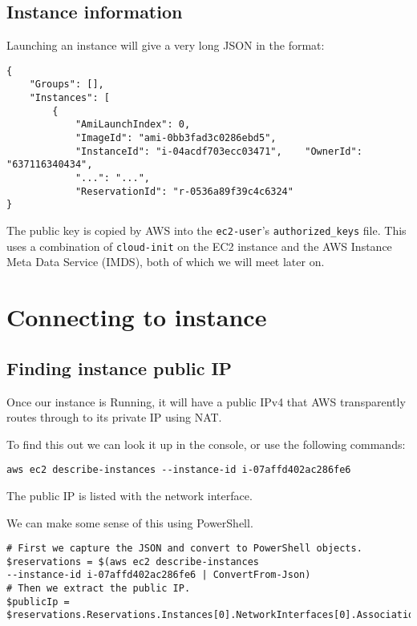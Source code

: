 \documentclass{pgnotes}
\begin{document}
\subsection{Instance information}

Launching an instance will give a very long JSON in the format:

\begin{verbatim}
{
    "Groups": [],
    "Instances": [
        {
            "AmiLaunchIndex": 0,
            "ImageId": "ami-0bb3fad3c0286ebd5",
            "InstanceId": "i-04acdf703ecc03471",    "OwnerId": "637116340434",
            "...": "...",
            "ReservationId": "r-0536a89f39c4c6324"
}
\end{verbatim}

The public key is copied by AWS into the \texttt{ec2-user}'s \texttt{authorized\_keys} file.
This uses a combination of \texttt{cloud-init} on the EC2 instance and the AWS Instance Meta Data Service (IMDS), both of which we will meet later on.

\section{Connecting to instance}
\label{sec:connecting-to-instance}

\subsection{Finding instance public IP}
\label{sec:finding-instance-public-ip}

Once our instance is Running, it will have a public IPv4 that AWS transparently routes through to its private IP using NAT.

To find this out we can look it up in the console, or use the following commands:
\begin{verbatim}
aws ec2 describe-instances --instance-id i-07affd402ac286fe6
\end{verbatim}
The public IP is listed with the network interface.

We can make some sense of this using PowerShell.

\begin{verbatim}
# First we capture the JSON and convert to PowerShell objects.
$reservations = $(aws ec2 describe-instances 
--instance-id i-07affd402ac286fe6 | ConvertFrom-Json)
# Then we extract the public IP.
$publicIp = $reservations.Reservations.Instances[0].NetworkInterfaces[0].Association.publicIp
\end{verbatim}
\end{document}
